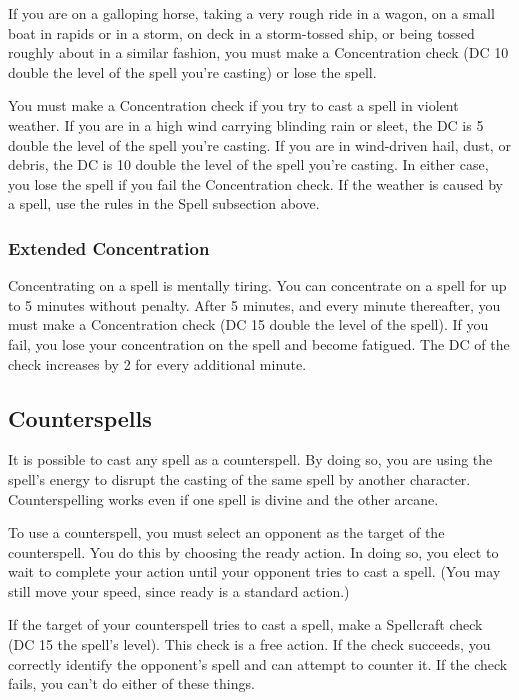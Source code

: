  If you are on a galloping horse, taking a very rough ride in a wagon, on a small boat in rapids or in a storm, on deck in a storm-tossed ship, or being tossed roughly about in a similar fashion, you must make a Concentration check (DC 10 \add double the level of the spell you're casting) or lose the spell.

 You must make a Concentration check if you try to cast a spell in violent weather. If you are in a high wind carrying blinding rain or sleet, the DC is 5 \add double the level of the spell you're casting. If you are in wind-driven hail, dust, or debris, the DC is 10 \add double the level of the spell you're casting. In either case, you lose the spell if you fail the Concentration check. If the weather is caused by a spell, use the rules in the Spell subsection above.

\subsubsection{Extended Concentration}
Concentrating on a spell is mentally tiring. You can concentrate on a spell for up to 5 minutes without penalty. After 5 minutes, and every minute thereafter, you must make a Concentration check (DC 15 \add double the level of the spell). If you fail, you lose your concentration on the spell and become fatigued. The DC of the check increases by 2 for every additional minute.

\subsection{Counterspells}
It is possible to cast any spell as a counterspell. By doing so, you are using the spell's energy to disrupt the casting of the same spell by another character. Counterspelling works even if one spell is divine and the other arcane.

 To use a counterspell, you must select an opponent as the target of the counterspell. You do this by choosing the ready action. In doing so, you elect to wait to complete your action until your opponent tries to cast a spell. (You may still move your speed, since ready is a standard action.)

If the target of your counterspell tries to cast a spell, make a Spellcraft check (DC 15 \add the spell's level). This check is a free action. If the check succeeds, you correctly identify the opponent's spell and can attempt to counter it. If the check fails, you can't do either of these things.

